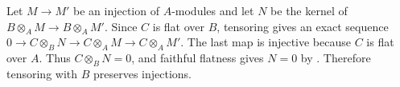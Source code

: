 Let $M\to M'$ be an injection of $A$-modules and let $N$ be the kernel of $B\otimes_A M\to B\otimes_A M'$. Since $C$ is flat over $B$, tensoring gives an exact sequence $0\to C\otimes_B N\to C\otimes_A M\to C\otimes_A M'$. The last map is injective because $C$ is flat over $A$. Thus $C\otimes_B N=0$, and faithful flatness gives $N=0$ by . Therefore tensoring with $B$ preserves injections.
